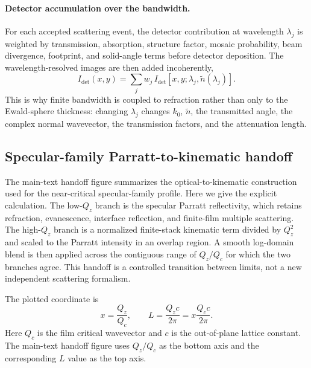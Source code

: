 \documentclass[11pt]{article}
\begin{document}
\paragraph{Detector accumulation over the bandwidth.}
For each accepted scattering event, the detector contribution at wavelength $\lambda_j$ is weighted
by transmission, absorption, structure factor, mosaic probability, beam divergence, footprint, and
solid-angle terms before detector deposition. The wavelength-resolved images are then added
incoherently,
\begin{equation}
  I_{\mathrm{det}}(x,y)
  =
  \sum_j
  w_j\,
  I_{\mathrm{det}}\!\left[x,y;\lambda_j,\tilde{n}(\lambda_j)\right].
  \label{eq:si_detector_bandwidth_sum}
\end{equation}
This is why finite bandwidth is coupled to refraction rather than only to the Ewald-sphere thickness:
changing $\lambda_j$ changes $k_0$, $\tilde{n}$, the transmitted angle, the complex normal
wavevector, the transmission factors, and the attenuation length.


\subsection{Specular-family Parratt-to-kinematic handoff}
\label{subsec:si_parratt_structure_handoff}

The main-text handoff figure summarizes the optical-to-kinematic construction
used for the near-critical specular-family profile. Here we give the explicit
calculation. The low-$Q_z$ branch is the specular Parratt reflectivity, which
retains refraction, evanescence, interface reflection, and finite-film multiple
scattering. The high-$Q_z$ branch is a normalized finite-stack kinematic term
divided by $Q_z^2$ and scaled to the Parratt intensity in an overlap region. A
smooth log-domain blend is then applied across the contiguous range of $Q_z/Q_c$
for which the two branches agree. This handoff is a controlled transition
between limits, not a new independent scattering formalism.

The plotted coordinate is
\begin{equation}
  x=\frac{Q_z}{Q_c},
  \qquad
  L=\frac{Q_z c}{2\pi}=x\frac{Q_c c}{2\pi}.
  \label{eq:si_handoff_x_l}
\end{equation}
Here $Q_c$ is the film critical wavevector and $c$ is the out-of-plane lattice
constant. The main-text handoff figure uses $Q_z/Q_c$ as the bottom axis and the
corresponding $L$ value as the top axis.
\end{document}
